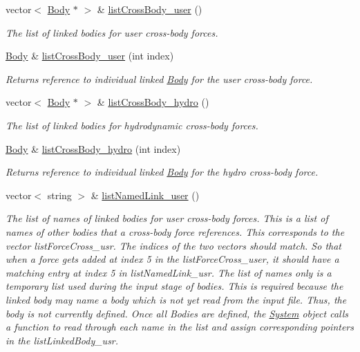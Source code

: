 \begin{DoxyCompactItemize}
vector$<$ \hyperlink{class_body}{Body} $\ast$ $>$ \& \hyperlink{class_body_a56ad2b60555f24df3feb5889974b27b2}{list\-Cross\-Body\-\_\-user} ()
\begin{DoxyCompactList}\small\item\em The list of linked bodies for user cross-\/body forces. \end{DoxyCompactList}\item 
\hyperlink{class_body}{Body} \& \hyperlink{class_body_afaf64ab1b477ff157f31e6824be1b767}{list\-Cross\-Body\-\_\-user} (int index)
\begin{DoxyCompactList}\small\item\em Returns reference to individual linked \hyperlink{class_body}{Body} for the user cross-\/body force. \end{DoxyCompactList}\item 
vector$<$ \hyperlink{class_body}{Body} $\ast$ $>$ \& \hyperlink{class_body_a7c930213d83962d4248068c38c589113}{list\-Cross\-Body\-\_\-hydro} ()
\begin{DoxyCompactList}\small\item\em The list of linked bodies for hydrodynamic cross-\/body forces. \end{DoxyCompactList}\item 
\hyperlink{class_body}{Body} \& \hyperlink{class_body_a9aaac9391781c67198f7b8b5785d4745}{list\-Cross\-Body\-\_\-hydro} (int index)
\begin{DoxyCompactList}\small\item\em Returns reference to individual linked \hyperlink{class_body}{Body} for the hydro cross-\/body force. \end{DoxyCompactList}\item 
vector$<$ string $>$ \& \hyperlink{class_body_a07d8ed6fdf5a4c6ef73b2d39b58403ce}{list\-Named\-Link\-\_\-user} ()
\begin{DoxyCompactList}\small\item\em The list of names of linked bodies for user cross-\/body forces. This is a list of names of other bodies that a cross-\/body force references. This corresponds to the vector list\-Force\-Cross\-\_\-usr. The indices of the two vectors should match. So that when a force gets added at index 5 in the list\-Force\-Cross\-\_\-user, it should have a matching entry at index 5 in list\-Named\-Link\-\_\-usr. The list of names only is a temporary list used during the input stage of bodies. This is required because the linked body may name a body which is not yet read from the input file. Thus, the body is not currently defined. Once all Bodies are defined, the \hyperlink{class_system}{System} object calls a function to read through each name in the list and assign corresponding pointers in the list\-Linked\-Body\-\_\-usr. \end{DoxyCompactList}\item 

\end{DoxyCompactItemize}
